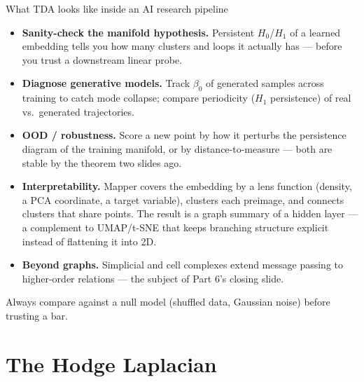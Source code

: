 \documentclass[10pt,aspectratio=169]{beamer}
\newcommand{\HL}[1]{\textcolor{blue!70!black}{#1}}
\begin{document}
    \begin{frame}{What TDA looks like inside an AI research pipeline}
        \small
        \begin{itemize}
            \item \textbf{Sanity-check the manifold hypothesis.} Persistent $H_0$/$H_1$ of a
            learned embedding tells you how many clusters and loops it actually has ---
            before you trust a downstream linear probe.
            \item \textbf{Diagnose generative models.} Track $\beta_0$ of generated samples
            across training to catch mode collapse; compare periodicity ($H_1$
            persistence) of real vs.\ generated trajectories.
            \item \textbf{OOD / robustness.} Score a new point by how it perturbs the
            persistence diagram of the training manifold, or by distance-to-measure ---
            both are stable by the theorem two slides ago.
            \item \textbf{Interpretability.} \HL{Mapper} covers the embedding by a lens
            function (density, a PCA coordinate, a target variable), clusters each
            preimage, and connects clusters that share points. The result is a graph
            summary of a hidden layer --- a complement to UMAP/t-SNE that keeps
            branching structure explicit instead of flattening it into 2D.
            \item \textbf{Beyond graphs.} Simplicial and cell complexes extend message passing
            to higher-order relations --- the subject of Part 6's closing slide.
        \end{itemize}
        \vspace{0.3em}

        \begin{center}
            \alert{Always compare against a null model} (shuffled data, Gaussian noise) before
            trusting a bar.
        \end{center}
    \end{frame}

    \section{The Hodge Laplacian}
\end{document}
